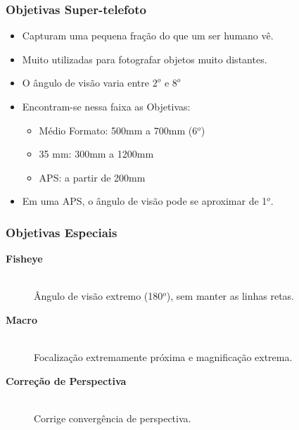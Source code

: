 \begin{frame}
    \frametitle{Objetivas Super-telefoto}
    \begin{itemize}
        \item Capturam uma pequena fração do que um ser humano vê.
        \item Muito utilizadas para fotografar objetos muito distantes.
        \item O ângulo de visão varia entre $2^o$ e $8^o$
        \item Encontram-se nessa faixa as Objetivas:

        {\small \begin{itemize}
            \item Médio Formato: 500mm a 700mm (6$^o$)
            \item 35 mm: 300mm a 1200mm
            \item APS: a partir de 200mm
        \end{itemize}}
        \item Em uma APS, o ângulo de visão pode se aproximar de 1$^o$.
    \end{itemize}
\end{frame}


\begin{frame}
    \frametitle{Objetivas Especiais}
    \begin{description}
        \item[\textbf{Fisheye}] \hfill \\ Ângulo de visão extremo (180$^o$), sem manter as linhas retas.
        \item[\textbf{Macro}] \hfill \\ Focalização extremamente próxima e magnificação extrema.
        \item[\textbf{Correção de Perspectiva}] \hfill \\ Corrige convergência de perspectiva.
    \end{description}
\end{frame}


